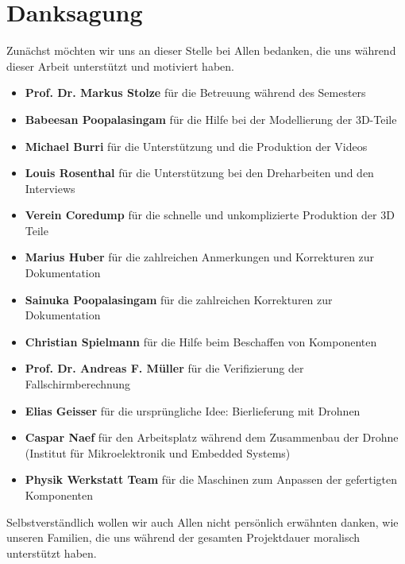 \newpage
\cleardoublepage
{}
{}
\chapter*{Danksagung}
Zunächst möchten wir uns an dieser Stelle bei Allen bedanken, die uns während dieser Arbeit unterstützt und motiviert haben.
\begin{itemize}
	\item{\textbf{Prof. Dr. Markus Stolze} für die Betreuung während des Semesters}
	\item{\textbf{Babeesan Poopalasingam} für die Hilfe bei der Modellierung der 3D-Teile}
	\item{\textbf{Michael Burri} für die Unterstützung und die Produktion der Videos}
	\item{\textbf{Louis Rosenthal} für die Unterstützung bei den Dreharbeiten und den Interviews}
	\item{\textbf{Verein Coredump} für die schnelle und unkomplizierte Produktion der 3D Teile}
	\item{\textbf{Marius Huber} für die zahlreichen Anmerkungen und Korrekturen zur Dokumentation}
	\item{\textbf{Sainuka Poopalasingam} für die zahlreichen Korrekturen zur Dokumentation}
    \item{\textbf{Christian Spielmann} für die Hilfe beim Beschaffen von Komponenten}
	\item{\textbf{Prof. Dr. Andreas F. Müller} für die Verifizierung der Fallschirmberechnung}
	\item{\textbf{Elias Geisser} für die ursprüngliche Idee: Bierlieferung mit Drohnen}
	\item{\textbf{Caspar Naef} für den Arbeitsplatz während dem Zusammenbau der Drohne (Institut für Mikroelektronik und Embedded Systems) }
	\item{\textbf{Physik Werkstatt Team} für die Maschinen zum Anpassen der gefertigten Komponenten}
\end{itemize}
Selbstverständlich wollen wir auch Allen nicht persönlich erwähnten danken, wie unseren Familien, die uns während der gesamten Projektdauer moralisch unterstützt haben.